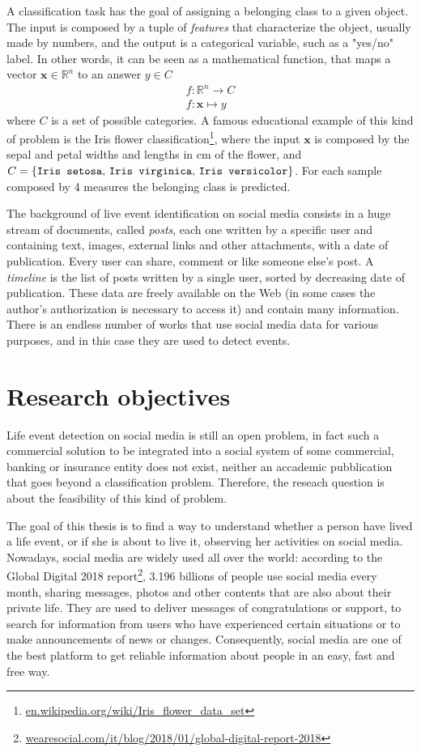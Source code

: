 A classification task has the goal of assigning a belonging class to a given object. The input is composed by a tuple of \emph{features} that characterize the object, usually made by numbers, and the output is a categorical variable, such as a "yes/no" label. In other words, it can be seen as a mathematical function, that maps a vector $ \boldsymbol{x} \in \mathbb{R}^n $ to an answer $ y \in C $
\begin{gather*}
f \colon \mathbb{R}^n \to C \\
f \colon \boldsymbol{x} \mapsto y
\end{gather*}
where $C$ is a set of possible categories. A famous educational example of this kind of problem is the Iris flower classification\footnote{\url{en.wikipedia.org/wiki/Iris_flower_data_set}}, where the input $ \boldsymbol{x} $ is composed by the sepal and petal widths and lengths in cm of the flower, and $C = \{\text{\texttt{Iris setosa}, \texttt{Iris virginica}, \texttt{Iris versicolor}}\}$. For each sample composed by 4 measures the belonging class is predicted.

The background of live event identification on social media consists in a huge stream of documents, called \emph{posts}, each one written by a specific user and containing text, images, external links and other attachments, with a date of publication. Every user can share, comment or like someone else's post. A \emph{timeline} is the list of posts written by a single user, sorted by decreasing date of publication. These data are freely available on the Web (in some cases the author's authorization is necessary to access it) and contain many information. There is an endless number of works that use social media data for various purposes, and in this case they are used to detect events.

\section{Research objectives}
Life event detection on social media is still an open problem, in fact such a commercial solution to be integrated into a social system of some commercial, banking or insurance entity does not exist, neither an accademic pubblication that goes beyond a classification problem. Therefore, the reseach question is about the feasibility of this kind of problem.

The goal of this thesis is to find a way to understand whether a person have lived a life event, or if she is about to live it, observing her activities on social media. Nowadays, social media are widely used all over the world: according to the Global Digital 2018 report\footnote{\url{wearesocial.com/it/blog/2018/01/global-digital-report-2018}}, 3.196 billions of people use social media every month, sharing messages, photos and other contents that are also about their private life. They are used to deliver messages of congratulations or support, to search for information from users who have experienced certain situations or to make announcements of news or changes. Consequently, social media are one of the best platform to get reliable information about people in an easy, fast and free way.

